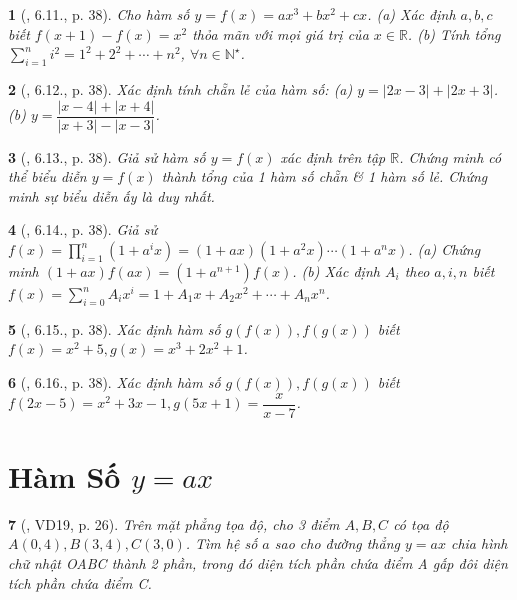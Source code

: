 \documentclass{article}
\newtheorem{baitoan}{}
\begin{document}
\begin{baitoan}[\cite{TLCT_THCS_Toan_9_dai_so}, 6.11., p. 38]
	Cho hàm số $y = f(x) = ax^3 + bx^2 + cx$. (a) Xác định $a,b,c$ biết $f(x + 1) - f(x) = x^2$ thỏa mãn với mọi giá trị của $x\in\mathbb{R}$. (b) Tính tổng $\sum_{i=1}^n i^2 = 1^2 + 2^2 + \cdots + n^2$, $\forall n\in\mathbb{N}^\star$.
\end{baitoan}

\begin{baitoan}[\cite{TLCT_THCS_Toan_9_dai_so}, 6.12., p. 38]
	Xác định tính chẵn lẻ của hàm số: (a) $y = |2x - 3| + |2x + 3|$. (b) $y = \dfrac{|x - 4| + |x + 4|}{|x + 3| - |x - 3|}$.
\end{baitoan}

\begin{baitoan}[\cite{TLCT_THCS_Toan_9_dai_so}, 6.13., p. 38]
	Giả sử hàm số $y = f(x)$ xác định trên tập $\mathbb{R}$. Chứng minh có thể biểu diễn $y = f(x)$ thành tổng của 1 hàm số chẵn \& 1 hàm số lẻ. Chứng minh sự biểu diễn ấy là duy nhất.
\end{baitoan}

\begin{baitoan}[\cite{TLCT_THCS_Toan_9_dai_so}, 6.14., p. 38]
	Giả sử $f(x) = \prod_{i=1}^n (1 + a^ix) = (1 + ax)(1 + a^2x)\cdots(1 + a^nx)$. (a) Chứng minh $(1 + ax)f(ax) = (1 + a^{n+1})f(x)$. (b) Xác định $A_i$ theo $a,i,n$ biết $f(x) = \sum_{i=0}^n A_ix^i = 1 + A_1x + A_2x^2 + \cdots + A_nx^n$.
\end{baitoan}

\begin{baitoan}[\cite{TLCT_THCS_Toan_9_dai_so}, 6.15., p. 38]
	Xác định hàm số $g(f(x)),f(g(x))$ biết $f(x) = x^2 + 5,g(x) = x^3 + 2x^2 + 1$.
\end{baitoan}

\begin{baitoan}[\cite{TLCT_THCS_Toan_9_dai_so}, 6.16., p. 38]
	Xác định hàm số $g(f(x)),f(g(x))$ biết $f(2x - 5) = x^2 + 3x - 1,g(5x + 1) = \dfrac{x}{x - 7}$.
\end{baitoan}


\section{Hàm Số $y = ax$}

\begin{baitoan}[\cite{Binh_Toan_9_tap_1}, VD19, p. 26]
	Trên mặt phẳng tọa độ, cho 3 điểm $A,B,C$ có tọa độ $A(0,4),B(3,4),C(3,0)$. Tìm hệ số $a$ sao cho đường thẳng $y = ax$ chia hình chữ nhật OABC thành 2 phần, trong đó diện tích phần chứa điểm A gấp đôi diện tích phần chứa điểm C.
\end{baitoan}
\end{document}
